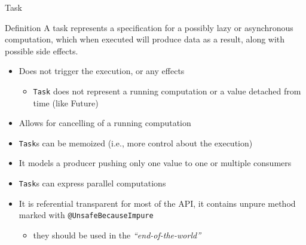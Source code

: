 \documentclass[presentation, 9pt]{beamer}\mode<presentation>{\usetheme{AMSBolognaFC}}
\begin{document}
\begin{frame}{Task \href{https://monix.io/docs/current/eval/task.html}{\faLink}}
	\begin{alertblock}{Definition}
		A task represents a specification for a possibly lazy or asynchronous
computation, which when executed will produce data as a result, along
with possible side effects.
	\end{alertblock}
	\begin{itemize}
  	\item Does not trigger the execution, or any effects 
		\begin{itemize}
			\item \texttt{Task} does not represent a running computation or a value detached from time (like Future)
		\end{itemize}
   	\item Allows for cancelling of a running computation
    \item \texttt{Task}s can be memoized (i.e., more control about the execution)
    \item It models a producer pushing only one value to one or multiple consumers
    \item \texttt{Task}s can express parallel computations
    \item It is referential transparent for most of the API, it contains unpure method marked with \texttt{@UnsafeBecauseImpure}
    \begin{itemize}
			\item they should be used in the \emph{``end-of-the-world''} %
		\end{itemize}
	\end{itemize}
\end{frame}
\end{document}
